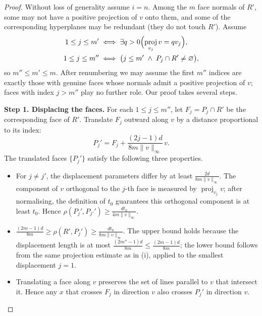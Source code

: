 \documentclass{amsart}
\theoremstyle{definition}
\DeclareMathOperator{\proj}{proj}
\begin{document}
\begin{proof}
Without loss of generality assume $i=n$.  Among the $m$ face normals of $R'$,
some may not have a positive projection of $v$ onto them, and some of the
corresponding hyperplanes may be redundant (they do not touch $R'$).  Assume 
\begin{align*}
1\leq j\leq m' &\iff \exists q>0\Bigl(\proj_{v_j} v=q v_j\Bigr),\\
1\leq j\leq m'' &\iff \bigl(j\leq m'\;\wedge\; P_j\cap R'\neq\varnothing\bigr),
\end{align*}
so $m''\leq m'\leq m$.  After renumbering we may assume the first $m''$
indices are exactly those with genuine faces whose normals admit a positive
projection of $v$; faces with index $j>m''$ play no further role. Our proof takes several steps.

\medskip\noindent
\textbf{Step 1.  Displacing the faces.}
For each $1\leq j\leq m''$, let $F_j=P_j\cap R'$ be the corresponding face
of $R'$.  Translate $F_j$ outward along $v$ by a distance proportional to
its index:
\[
P_j' = F_j+\frac{(2j-1)d}{8m\|v\|_\infty}\,v .
\]
The translated faces $\{P_j'\}$ satisfy the following three properties.
\begin{itemize}
\item[(i)] For $j\neq j'$, the displacement parameters differ by at least
$\frac{2d}{8m\|v\|_\infty}$.  The component of $v$ orthogonal to the $j$-th
face is measured by $\proj_{v_j}v$; after normalising, the definition of
$t_0$ guarantees this orthogonal component is at least $t_0$.  Hence
$\rho(P_j',P_{j'}') \geq \frac{d t_0}{4m\|v\|_\infty}$.
\item[(ii)] $\frac{(2m-1)d}{8m}\geq\rho(R', P_j') \geq \frac{d t_0}{8m\|v\|_\infty}$.
The upper bound holds because the displacement length is at most
$\frac{(2m''-1)d}{8m}\leq\frac{(2m-1)d}{8m}$; the lower bound follows from
the same projection estimate as in (i), applied to the smallest displacement
$j=1$.
\item[(iii)] Translating a face along $v$ preserves the set of lines parallel
to $v$ that intersect it.  Hence any $x$ that crosses $F_j$ in direction $v$
also crosses $P_j'$ in direction $v$.
\end{itemize}


\end{proof}
\end{document}
